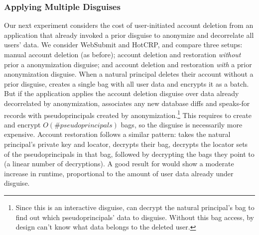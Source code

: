 \subsubsection{Applying Multiple Disguises}
%
Our next experiment considers the cost of user-initiated account
deletion from an application that already invoked a prior disguise
to anonymize and decorrelate all users' data.
%
We consider WebSubmit and HotCRP, and compare three setups: \one{}
manual account deletion (as before); \two{} account deletion and
restoration \emph{without} prior a anonymization disguise; and
\three{} account deletion and restoration \emph{with} a prior
anonymization disguise.
%
When a natural principal deletes their account without a prior
disguise, \sys creates a single bag with all user data and encrypts
it as a batch.
%
But if the application applies the account deletion disguise over
data already decorrelated by anonymization, \sys associates any new
database diffs and speaks-for records with pseudoprincipals created
by anonymization.\footnote{Since this is an interactive disguise, \sys
can decrypt the natural principal's bag to find out which
pseudoprincipals' data to disguise. Without this bag access, \sys
by design can't know what data belongs to the deleted user.}
%
This requires \sys to create and encrypt
$O(\textit{\# pseudoprincipals})$ bags, so the disguise is necessarily
more expensive.
%
Account restoration follows a similar pattern: \sys takes the natural
principal's private key and locator, decrypts their bag, decrypts
the locator sets of the pseudoprincipals in that bag,
followed by decrypting the bags they point to (a linear number of
decryptions).
%
A good result for \sys would show a moderate increase in runtime,
proportional to the amount of user data already under disguise.
%

%

